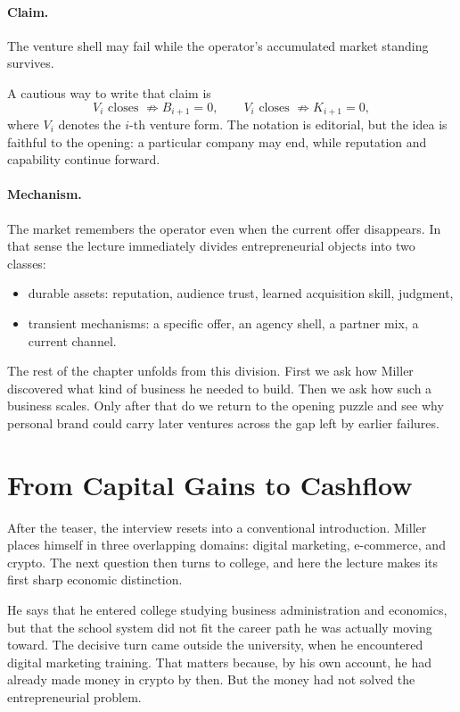 \paragraph{Claim.} The venture shell may fail while the operator's accumulated market standing survives.

A cautious way to write that claim is
\begin{equation}
V_i\text{ closes } \not\Rightarrow B_{i+1}=0,
\qquad
V_i\text{ closes } \not\Rightarrow K_{i+1}=0,
\end{equation}
where \(V_i\) denotes the \(i\)-th venture form. The notation is editorial, but the idea is faithful to the opening: a particular company may end, while reputation and capability continue forward.

\paragraph{Mechanism.} The market remembers the operator even when the current offer disappears. In that sense the lecture immediately divides entrepreneurial objects into two classes:
\begin{itemize}
\item durable assets: reputation, audience trust, learned acquisition skill, judgment,
\item transient mechanisms: a specific offer, an agency shell, a partner mix, a current channel.
\end{itemize}

The rest of the chapter unfolds from this division. First we ask how Miller discovered what kind of business he needed to build. Then we ask how such a business scales. Only after that do we return to the opening puzzle and see why personal brand could carry later ventures across the gap left by earlier failures.

\section{From Capital Gains to Cashflow}

After the teaser, the interview resets into a conventional introduction. Miller places himself in three overlapping domains: digital marketing, e-commerce, and crypto. The next question then turns to college, and here the lecture makes its first sharp economic distinction.

He says that he entered college studying business administration and economics, but that the school system did not fit the career path he was actually moving toward. The decisive turn came outside the university, when he encountered digital marketing training. That matters because, by his own account, he had already made money in crypto by then. But the money had not solved the entrepreneurial problem.

